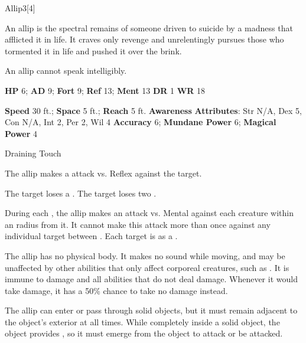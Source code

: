   \begin{monsection}{Allip}{3}[4]
    \vspace{-1em}\vspace{-1em}
    \vspace{0em}

    
      An allip is the spectral remains of someone driven to suicide by a madness that afflicted it in life.
      It craves only revenge and unrelentingly pursues those who tormented it in life and pushed it over the brink.

      An allip cannot speak intelligibly.
    

    \begin{spellcontent}
      \begin{spelltargetinginfo}
        \pari \textbf{HP} 6;
          \textbf{AD} 9;
          \textbf{Fort} 9;
          \textbf{Ref} 13;
          \textbf{Ment} 13
        \pari \textbf{DR} 1
        \pari \textbf{WR} 18
        
      \end{spelltargetinginfo}
    \end{spellcontent}
    \begin{monsterfooter}
      \pari \textbf{Speed} 30 ft.;
        \textbf{Space} 5 ft.;
        \textbf{Reach} 5 ft.
      \pari \textbf{Awareness} 
      \pari \textbf{Attributes}:
        Str N/A, Dex 5,
        Con N/A, Int 2,
        Per 2, Wil 4
      \pari \textbf{Accuracy} 6;
        \textbf{Mundane Power} 6;
      \textbf{Magical Power} 4
    \end{monsterfooter}
  \end{monsection}
  \begin{freeability}{Draining Touch}
      
      The allip makes a  attack
        vs. Reflex against the target.
    
    \hit The target loses a .
    \crit The target loses two .
    \end{freeability}
  
          During each , the allip makes an attack vs. Mental against each creature
          within an \arealarge radius  from it.
          It cannot make this attack more than once against any individual target between .
          \hit Each target is  as a .
        
      The allip has no physical body.
      It makes no sound while moving, and may be unaffected by other abilities that only affect corporeal creatures, such as .
      It is immune to  damage and all  abilities that do not deal damage.
      Whenever it would take damage, it has a 50\% chance to take no damage instead.

      The allip can enter or pass through solid objects, but it must remain adjacent to the object's exterior at all times.
      While completely inside a solid object, the object provides , so it must emerge from the object to attack or be attacked.
  